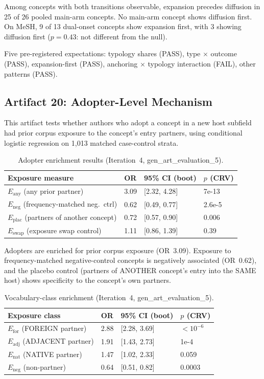 \documentclass[11pt,letterpaper]{article}
\begin{document}
Among concepts with both transitions observable, expansion precedes diffusion in 25 of 26 pooled main-arm concepts. No main-arm concept shows diffusion first. On MeSH, 9 of 13 dual-onset concepts show expansion first, with 3 showing diffusion first ($p = 0.43$: not different from the null).

Five pre-registered expectations: typology shares (PASS), type $\times$ outcome (PASS), expansion-first (PASS), anchoring $\times$ typology interaction (FAIL), other patterns (PASS).

\subsection{Artifact 20: Adopter-Level Mechanism}

This artifact tests whether authors who adopt a concept in a new host subfield had prior corpus exposure to the concept's entry partners, using conditional logistic regression on 1,013 matched case-control strata.

\begin{table}[!htbp]
\centering
\caption{Adopter enrichment results (Iteration~4, gen\_art\_evaluation\_5).}
\label{tab:adopter}
\begin{tabular}{L{5cm}R{1cm}L{2.5cm}R{1.8cm}}
\toprule
Exposure measure & OR & 95\% CI (boot) & $p$ (CRV) \\
\midrule
$E_{\mathrm{any}}$ (any prior partner) & 3.09 & [2.32, 4.28] & 7e-13 \\
$E_{\mathrm{neg}}$ (frequency-matched neg.\ ctrl) & 0.62 & [0.49, 0.77] & 2.6e-5 \\
$E_{\mathrm{plac}}$ (partners of another concept) & 0.72 & [0.57, 0.90] & 0.006 \\
$E_{\mathrm{swap}}$ (exposure swap control) & 1.11 & [0.86, 1.39] & 0.39 \\
\bottomrule
\end{tabular}
\end{table}

Adopters are enriched for prior corpus exposure (OR~3.09). Exposure to frequency-matched negative-control concepts is negatively associated (OR~0.62), and the placebo control (partners of ANOTHER concept's entry into the SAME host) shows specificity to the concept's own partners.

\begin{table}[!htbp]
\centering
\caption{Vocabulary-class enrichment (Iteration~4, gen\_art\_evaluation\_5).}
\label{tab:vocab_class}
\begin{tabular}{L{5cm}R{1cm}L{2.5cm}R{1.8cm}}
\toprule
Exposure class & OR & 95\% CI (boot) & $p$ (CRV) \\
\midrule
$E_{\mathrm{for}}$ (FOREIGN partner) & 2.88 & [2.28, 3.69] & $< 10^{-6}$ \\
$E_{\mathrm{adj}}$ (ADJACENT partner) & 1.91 & [1.43, 2.73] & 1e-4 \\
$E_{\mathrm{nat}}$ (NATIVE partner) & 1.47 & [1.02, 2.33] & 0.059 \\
$E_{\mathrm{neg}}$ (non-partner) & 0.64 & [0.51, 0.82] & 0.0003 \\
\bottomrule
\end{tabular}
\end{table}
\end{document}

